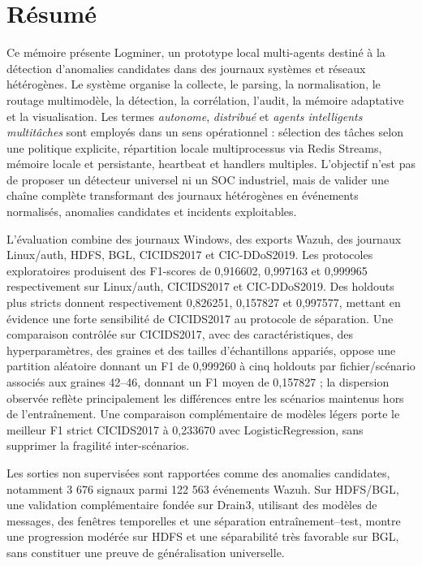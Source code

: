 \documentclass[12pt,a4paper,oneside]{report}
\newcommand{\logminer}{Logminer}
\begin{document}





\chapter*{Résumé}

Ce mémoire présente \logminer{}, un prototype local multi-agents destiné à la détection d'anomalies candidates dans des journaux systèmes et réseaux hétérogènes. Le système organise la collecte, le parsing, la normalisation, le routage multimodèle, la détection, la corrélation, l'audit, la mémoire adaptative et la visualisation. Les termes \textit{autonome}, \textit{distribué} et \textit{agents intelligents multitâches} sont employés dans un sens opérationnel : sélection des tâches selon une politique explicite, répartition locale multiprocessus via Redis Streams, mémoire locale et persistante, heartbeat et handlers multiples. L'objectif n'est pas de proposer un détecteur universel ni un SOC industriel, mais de valider une chaîne complète transformant des journaux hétérogènes en événements normalisés, anomalies candidates et incidents exploitables.

L'évaluation combine des journaux Windows, des exports Wazuh, des journaux Linux/auth, HDFS, BGL, CICIDS2017 et CIC-DDoS2019. Les protocoles exploratoires produisent des F1-scores de 0,916602, 0,997163 et 0,999965 respectivement sur Linux/auth, CICIDS2017 et CIC-DDoS2019. Des holdouts plus stricts donnent respectivement 0,826251, 0,157827 et 0,997577, mettant en évidence une forte sensibilité de CICIDS2017 au protocole de séparation. Une comparaison contrôlée sur CICIDS2017, avec des caractéristiques, des hyperparamètres, des graines et des tailles d'échantillons appariés, oppose une partition aléatoire donnant un F1 de 0,999260 à cinq holdouts par fichier/scénario associés aux graines 42--46, donnant un F1 moyen de 0,157827 ; la dispersion observée reflète principalement les différences entre les scénarios maintenus hors de l'entraînement. Une comparaison complémentaire de modèles légers porte le meilleur F1 strict CICIDS2017 à 0,233670 avec LogisticRegression, sans supprimer la fragilité inter-scénarios.

Les sorties non supervisées sont rapportées comme des anomalies candidates, notamment 3 676 signaux parmi 122 563 événements Wazuh. Sur HDFS/BGL, une validation complémentaire fondée sur Drain3, utilisant des modèles de messages, des fenêtres temporelles et une séparation entraînement--test, montre une progression modérée sur HDFS et une séparabilité très favorable sur BGL, sans constituer une preuve de généralisation universelle.
\end{document}
